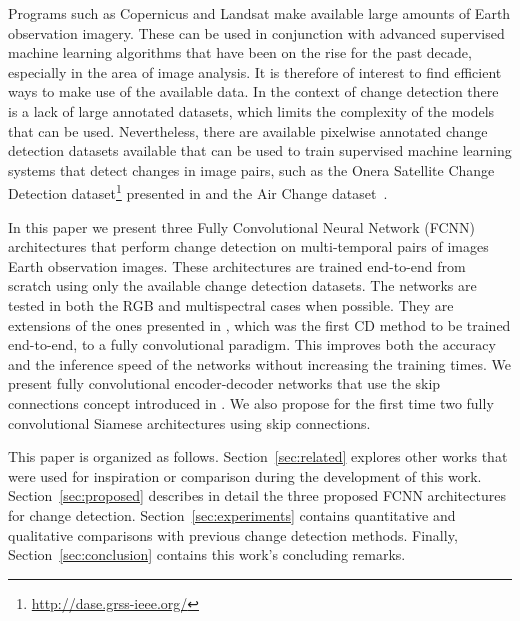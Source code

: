 \documentclass{article}
\begin{document}
Programs such as Copernicus and Landsat make available large amounts of Earth observation imagery. These can be used in conjunction with advanced supervised machine learning algorithms that have been on the rise for the past decade, especially in the area of image analysis. It is therefore of interest to find efficient ways to make use of the available data. In the context of change detection there is a lack of large annotated datasets, which limits the complexity of the models that can be used. Nevertheless, there are available pixelwise annotated change detection datasets available that can be used to train supervised machine learning systems that detect changes in image pairs, such as the Onera Satellite Change Detection dataset\footnote{\url{http://dase.grss-ieee.org/}} presented in \cite{daudt2018urban} and the Air Change dataset~\cite{benedek2009change}. 








In this paper we present three Fully Convolutional Neural Network (FCNN) architectures that perform change detection on multi-temporal pairs of images Earth observation images. These architectures are trained end-to-end from scratch using only the available change detection datasets. The networks are tested in both the RGB and multispectral cases when possible. They are extensions of the ones presented in \cite{daudt2018urban}, which was the first CD method to be trained end-to-end, to a fully convolutional paradigm. This improves both the accuracy and the inference speed of the networks without increasing the training times. We present fully convolutional encoder-decoder networks that use the skip connections concept introduced in \cite{ronneberger2015u}. We also propose for the first time two fully convolutional Siamese architectures using skip connections.

 



This paper is organized as follows. Section~\ref{sec:related} explores other works that were used for inspiration or comparison during the development of this work. Section~\ref{sec:proposed} describes in detail the three proposed FCNN architectures for change detection. Section~\ref{sec:experiments} contains quantitative and qualitative comparisons with previous change detection methods. Finally, Section~\ref{sec:conclusion} contains this work's concluding remarks.
\end{document}
